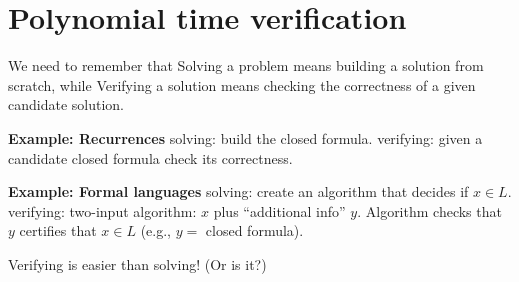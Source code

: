 \section{Polynomial time verification}

We need to remember that Solving a problem means building a solution from scratch, while Verifying a solution means checking the correctness of a given candidate solution.


\textbf{Example: Recurrences}
solving: build the closed formula.
verifying: given a candidate closed formula check its correctness.

\textbf{Example: Formal languages}
solving: create an algorithm that decides if $x\in L$.
verifying: two-input algorithm: $x$ plus ``additional info'' $y$. Algorithm checks that $y$ certifies that $x\in L$ (e.g., $y=$ closed formula).

Verifying is easier than solving! (Or is it?)
